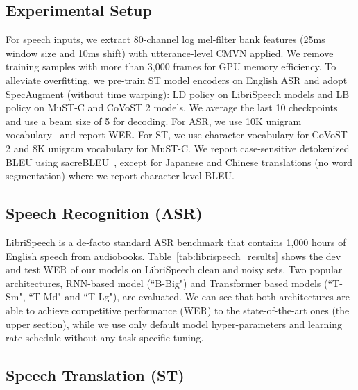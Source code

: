 \documentclass[11pt,a4paper]{article}
\begin{document}
\subsection{Experimental Setup}
For speech inputs, we extract 80-channel log mel-filter bank features (25ms window size and 10ms shift) with utterance-level CMVN applied. We remove training samples with more than 3,000 frames for GPU memory efficiency. To alleviate overfitting, we pre-train ST model encoders on English ASR and adopt SpecAugment (without time warping): LD policy on LibriSpeech models and LB policy on MuST-C and CoVoST 2 models. We average the last 10 checkpoints and use a beam size of 5 for decoding. For ASR, we use 10K unigram vocabulary~\citep{kudo-richardson-2018-sentencepiece} and report WER. For ST, we use character vocabulary for CoVoST 2 and 8K unigram vocabulary for MuST-C. We report case-sensitive detokenized BLEU using sacreBLEU~\cite{post-2018-call}, except for Japanese and Chinese translations (no word segmentation) where we report character-level BLEU.

\subsection{Speech Recognition (ASR)}
LibriSpeech is a de-facto standard ASR benchmark that contains 1,000 hours of English speech from audiobooks. Table~\ref{tab:librispeech_results} shows the dev and test WER of our models on LibriSpeech clean and noisy sets. Two popular architectures, RNN-based model (``B-Big") and Transformer based models (``T-Sm", ``T-Md" and ``T-Lg"), are evaluated. We can see that both architectures are able to achieve competitive performance (WER) to the state-of-the-art ones (the upper section), while we use only default model hyper-parameters and learning rate schedule without any task-specific tuning.


\subsection{Speech Translation (ST)}
\end{document}
